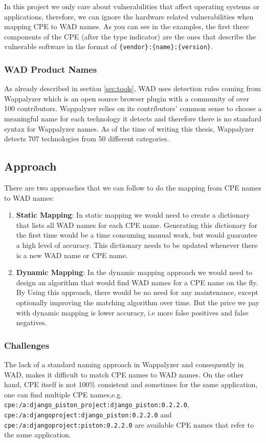 In this project we only care about vulnerabilities that affect operating systems or applications, therefore, we can ignore the hardware related vulnerabilities when mapping CPE to WAD names. As you can see in the examples, the first three components of the CPE (after the type indicator) are the ones that describe the vulnerable software in the format of \texttt{\{vendor\}:\{name\}:\{version\}}.
 

\subsubsection{WAD Product Names}
As already described in section \ref{sec:tools}, WAD uses detection rules coming from Wappalyzer which is an open source browser plugin with a community of over 100 contributors. Wappalyzer relies on its contributors' common sense to choose a meaningful name for each technology it detects and therefore there is no standard syntax for Wappalyzer names. As of the time of writing this thesis, Wappalyzer detects 707 technologies from 50 different categories.


\subsection{Approach}

There are two approaches that we can follow to do the mapping from CPE names to WAD names:
\begin{enumerate}
\item \textbf{Static Mapping}: In static mapping we would need to create a dictionary that lists all WAD names for each CPE name. Generating this dictionary for the first time would be a time consuming manual work, but would guarantee a high level of accuracy. This dictionary needs to be updated whenever there is a new WAD name or CPE name. 
\item \textbf{Dynamic Mapping}: In the dynamic mapping approach we would need to design an algorithm that would find WAD names for a CPE name on the fly. By Using this approach, there would be no need for any maintenance, except optionally improving the matching algorithm over time. But the price we pay with dynamic mapping is lower accuracy, i.e more false positives and false negatives.  
\end{enumerate} 



\subsubsection{Challenges}
The lack of a standard naming approach in Wappalyzer and consequently in WAD, makes it difficult to match CPE names to WAD names. On the other hand, CPE itself is not 100\% consistent and sometimes for the same application, one can find multiple CPE names,e.g. \texttt{cpe:/a:django\_piston\_project:django\_piston:0.2.2.0}, \texttt{cpe:/a:djangoproject:django\_piston:0.2.2.0} and \texttt{cpe:/a:djangoproject:piston:0.2.2.0} are available CPE names that refer to the same application.
